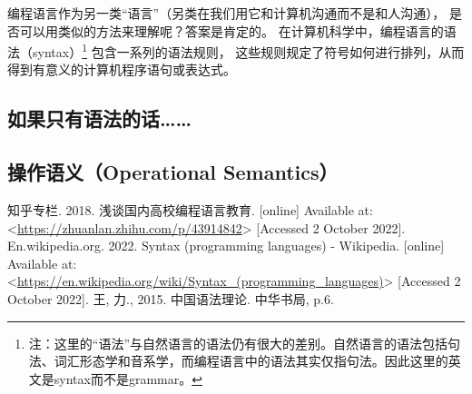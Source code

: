 \documentclass[../main.tex]{subfiles}
\begin{document}
  \indent 编程语言作为另一类“语言”（另类在我们用它和计算机沟通而不是和人沟通），
  是否可以用类似的方法来理解呢？答案是肯定的。
  在计算机科学中，编程语言的语法（syntax）\footnote[1]{注：这里的“语法”与自然语言的语法仍有很大的差别。自然语言的语法包括句法、词汇形态学和音系学\cite{grammar}，而编程语言中的语法其实仅指句法。因此这里的英文是syntax而不是grammar。}
  包含一系列的语法规则，
  这些规则规定了符号如何进行排列，从而得到有意义的计算机程序语句或表达式。\cite{syntaxwiki}

  \subsection{如果只有语法的话……}

  \subsection{操作语义（Operational Semantics）}

  \begin{thebibliography}{3}
     知乎专栏. 2018. 浅谈国内高校编程语言教育. [online] Available at: <\url{https://zhuanlan.zhihu.com/p/43914842}> [Accessed 2 October 2022].
     En.wikipedia.org. 2022. Syntax (programming languages) - Wikipedia. [online] Available at: <\url{https://en.wikipedia.org/wiki/Syntax_(programming_languages)}> [Accessed 2 October 2022].
     王, 力., 2015. 中国语法理论. 中华书局, p.6.
  \end{thebibliography}
\end{document}
